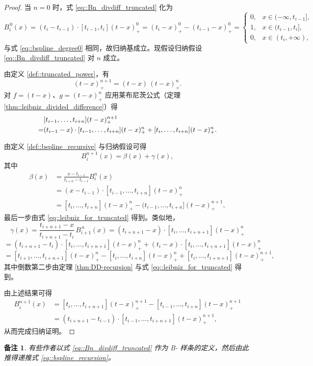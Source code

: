 \documentclass[a4paper]{ctexart}
\newtheorem{remark}{备注}
\numberwithin{theorem}{section}
\numberwithin{equation}{section}
\numberwithin{figure}{section}
\numberwithin{remark}{section}
\begin{document}
\begin{proof}
当 $n=0$ 时，式 \eqref{eq::Bn_divdiff_truncated} 化为
\[
B^{\,0}_i(x)=(t_i-t_{i-1})\cdot [t_{i-1},t_i](t-x)^{0}_{+}
=(t_i-x)^{0}_{+}-(t_{i-1}-x)^{0}_{+}
=\begin{cases}
0, & x\in(-\infty,t_{i-1}],\\
1, & x\in(t_{i-1},t_i],\\
0, & x\in(t_i,+\infty),
\end{cases}
\]
与式 \eqref{eq::bspline_degree0} 相同，故归纳基成立。现假设归纳假设 \eqref{eq::Bn_divdiff_truncated} 对 $n$ 成立。

由定义 \ref{def::truncated_power}，有
\[
(t-x)^{n+1}_{+}=(t-x)\,(t-x)^{n}_{+}.
\]
对 $f=(t-x)$、$g=(t-x)^{n}_{+}$ 应用莱布尼茨公式（定理 \ref{thm::leibniz_divided_difference}）得
\begin{equation}
\label{eq::leibniz_for_truncated}
\begin{aligned}
&\relax [t_{i-1},\ldots,t_{i+n}](t-x)^{n+1}_{+} \\
=&(t_{i-1}-x)\cdot [t_{i-1},\ldots,t_{i+n}](t-x)^{n}_{+}
+[t_i,\ldots,t_{i+n}](t-x)^{n}_{+}.    
\end{aligned}
\end{equation}

由定义 \ref{def::bspline_recursive} 与归纳假设可得
\[
B^{n+1}_i(x)=\beta(x)+\gamma(x),
\]
其中
\[
\begin{aligned}
\beta(x)&=\frac{x-t_{i-1}}{t_{i+n}-t_{i-1}}B^{n}_i(x) \\
&=(x-t_{i-1})\cdot [t_{i-1},\ldots,t_{i+n}](t-x)^{n}_{+} \\
&=[t_i,\ldots,t_{i+n}](t-x)^{n}_{+}-(t_{i-1},\ldots,t_{i+n}](t-x)^{n+1}_{+},    
\end{aligned}
\]
最后一步由式 \eqref{eq::leibniz_for_truncated} 得到。类似地，
\[
\gamma(x)=\frac{t_{i+n+1}-x}{t_{i+n+1}-t_i}\,B^{\,n}_{i+1}(x)
=(t_{i+n+1}-x)\cdot [t_i,\ldots,t_{i+n+1}](t-x)^{n}_{+}
\]
\[
=(t_{i+n+1}-t_i)\cdot [t_i,\ldots,t_{i+n+1}](t-x)^{n}_{+}
+(t_i-x)\cdot [t_i,\ldots,t_{i+n+1}](t-x)^{n}_{+}
\]
\[
=[t_{i+1},\ldots,t_{i+n+1}](t-x)^{n}_{+}
-[t_i,\ldots,t_{i+n}](t-x)^{n}_{+}
+[t_i,\ldots,t_{i+n+1}](t-x)^{n+1}_{+},
\]
其中倒数第二步由定理 \ref{thm:DD-recursion} 与式 \eqref{eq::leibniz_for_truncated} 得到。

由上述结果可得
\[
\begin{aligned}
B^{n+1}_i(x)&=[t_i,\ldots,t_{i+n+1}](t-x)^{n+1}_{+}
-[t_{i-1},\ldots,t_{i+n}](t-x)^{n+1}_{+} \\
&=(t_{i+n+1}-t_{i-1})\cdot [t_{i-1},\ldots,t_{i+n+1}](t-x)^{n+1}_{+},   
\end{aligned}
\]
从而完成归纳证明。
\end{proof}

\begin{remark}
    \label{rem::alt_def_bspline}
有些作者以式 \eqref{eq::Bn_divdiff_truncated} 作为 B- 样条的定义，然后由此推得递推式 \eqref{eq::bspline_recursion}。
\end{remark}



\end{document}
